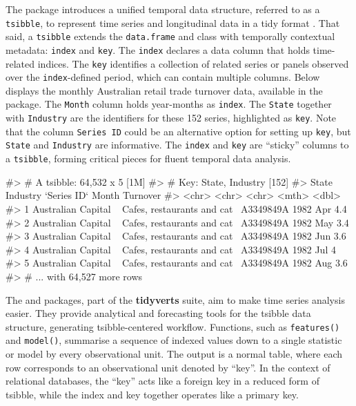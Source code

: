 The  package \citep{wang2020tsibble} introduces a
unified temporal data structure, referred to as a \texttt{tsibble}, to
represent time series and longitudinal data in a tidy format
\citep{wickham2014tidy}. That said, a \texttt{tsibble} extends the
\texttt{data.frame} and  class with temporally
contextual metadata: \texttt{index} and \texttt{key}. The \texttt{index}
declares a data column that holds time-related indices. The \texttt{key}
identifies a collection of related series or panels observed over the
\texttt{index}-defined period, which can contain multiple columns. Below
displays the monthly Australian retail trade turnover data, available in
the  package. The \texttt{Month} column holds
year-months as \texttt{index}. The \texttt{State} together with
\texttt{Industry} are the identifiers for these 152 series, highlighted
as \texttt{key}. Note that the column \texttt{Series\ ID} could be an
alternative option for setting up \texttt{key}, but \texttt{State} and
\texttt{Industry} are informative. The \texttt{index} and \texttt{key}
are ``sticky'' columns to a \texttt{tsibble}, forming critical pieces
for fluent temporal data analysis.

\begin{Schunk}
\begin{Soutput}
#> # A tsibble: 64,532 x 5 [1M]
#> # Key:       State, Industry [152]
#>   State                Industry                    `Series ID`    Month Turnover
#>   <chr>                <chr>                       <chr>          <mth>    <dbl>
#> 1 Australian Capital ~ Cafes, restaurants and cat~ A3349849A   1982 Apr      4.4
#> 2 Australian Capital ~ Cafes, restaurants and cat~ A3349849A   1982 May      3.4
#> 3 Australian Capital ~ Cafes, restaurants and cat~ A3349849A   1982 Jun      3.6
#> 4 Australian Capital ~ Cafes, restaurants and cat~ A3349849A   1982 Jul      4  
#> 5 Australian Capital ~ Cafes, restaurants and cat~ A3349849A   1982 Aug      3.6
#> # ... with 64,527 more rows
\end{Soutput}
\end{Schunk}

The  and  packages, part of the
\textbf{tidyverts} suite, aim to make time series analysis easier. They
provide analytical and forecasting tools for the tsibble data structure,
generating tsibble-centered workflow. Functions, such as
\texttt{features()} and \texttt{model()}, summarise a sequence of
indexed values down to a single statistic or model by every
observational unit. The output is a normal table, where each row
corresponds to an observational unit denoted by ``key''. In the context
of relational databases, the ``key'' acts like a foreign key in a
reduced form of tsibble, while the index and key together operates like
a primary key.

